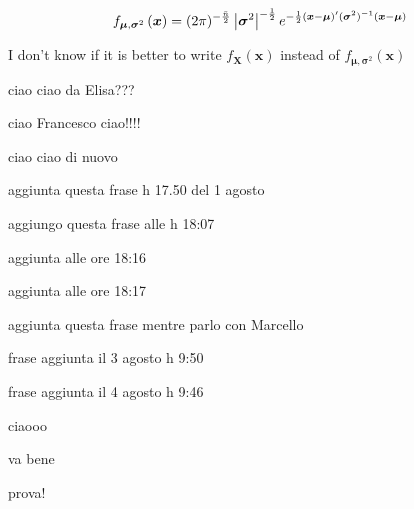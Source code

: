 \documentclass{article}
\begin{document}
\begin{equation*}
f_{\boldsymbol{\mu },\boldsymbol{\sigma }^{2}}\left( \boldsymbol{x}\right)
=(2\pi )^{-\frac{\bar{n}}{2}}\left\vert \boldsymbol{\sigma }^{2}\right\vert
^{-\frac{1}{2}}e^{-\frac{1}{2}\left( \boldsymbol{x}-\boldsymbol{\mu }\right)
^{\prime }(\boldsymbol{\sigma }^{2})^{-1}\left( \boldsymbol{x}-\boldsymbol{%
\mu }\right) }
\end{equation*}

I don't know if it is better to write $f_{\boldsymbol{X}}\left( \boldsymbol{x%
}\right) $ instead of $f_{\boldsymbol{\mu },\boldsymbol{\sigma }^{2}}\left( 
\boldsymbol{x}\right) $

\bigskip

ciao ciao da Elisa???

\bigskip

ciao Francesco ciao!!!!

\bigskip

ciao ciao di nuovo

aggiunta questa frase h 17.50 del 1 agosto

\bigskip

aggiungo questa frase alle h 18:07

\bigskip

aggiunta alle ore 18:16

\bigskip

aggiunta alle ore 18:17

\bigskip

aggiunta questa frase mentre parlo con Marcello

frase aggiunta il 3 agosto h 9:50

\bigskip

frase aggiunta il 4 agosto h 9:46

ciaooo

va bene

prova!
\end{document}
